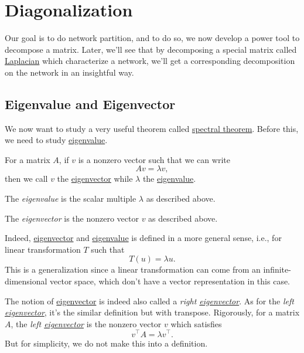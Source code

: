 \chapter{Diagonalization}
Our goal is to do network partition, and to do so, we now develop a power tool to decompose a matrix. Later, we'll see that by decomposing a
special matrix called \hyperref[def:Laplacian]{Laplacian} which characterize a network, we'll get a corresponding decomposition on the network
in an insightful way.

\section{Eigenvalue and Eigenvector}
We now want to study a very useful theorem called \hyperref[thm:spectral-theorem]{spectral theorem}. Before this, we need to study \hyperref[def:eigenvalue]{eigenvalue}.

\begin{definition*}
	For a matrix \(A\), if \(v\) is a nonzero vector such that we can write
	\[
		Av = \lambda v,
	\]
	then we call \(v\) the \hyperref[def:eigenvector]{eigenvector} while \(\lambda\) the \hyperref[def:eigenvalue]{eigenvalue}.
	\begin{definition}[Eigenvalue]\label{def:eigenvalue}
		The \emph{eigenvalue} is the scalar multiple \(\lambda \) as described above.
	\end{definition}

	\begin{definition}[Eigenvector]\label{def:eigenvector}
		The \emph{eigenvector} is the nonzero vector \(v\) as described above.
	\end{definition}
\end{definition*}

\begin{remark}
	Indeed, \hyperref[def:eigenvector]{eigenvector} and \hyperref[def:eigenvalue]{eigenvalue} is defined in a more general sense, i.e., for linear transformation \(T\) such that
	\[
		T(u) = \lambda u.
	\]
	This is a generalization since a linear transformation can come from an infinite-dimensional vector space, which don't have a vector representation in this case.
\end{remark}

\begin{note}
	The notion of \hyperref[def:eigenvector]{eigenvector} is indeed also called a \emph{right \hyperref[def:eigenvector]{eigenvector}}. As for the
	\emph{left \hyperref[def:eigenvector]{eigenvector}}, it's the similar definition but with transpose. Rigorously, for a matrix \(A\), the
	\emph{left \hyperref[def:eigenvector]{eigenvector}} is the nonzero vector \(v\) which satisfies
	\[
		v^{\top} A = \lambda v^{\top}.
	\]
	But for simplicity, we do not make this into a definition.
\end{note}


